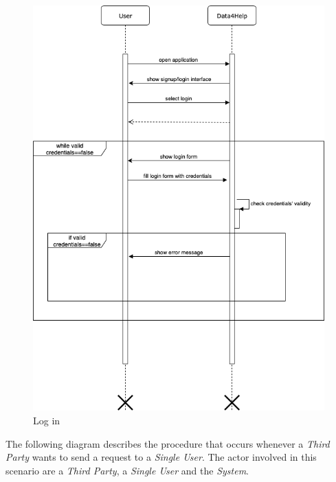 \documentclass[titlepage]{article}
\begin{document}
\begin{figure}[H]
			\center
  			\includegraphics[width=\textwidth]{Diagrammi/sd2.png}
			\caption{Log in}
			\label{fig:sd2}
\end{figure}
The following diagram describes the procedure that occurs whenever a {\it Third Party} wants to send a request to a {\it Single User}. The actor involved in this scenario are a {\it Third Party}, a {\it Single User} and the {\it System}.
\end{document}
